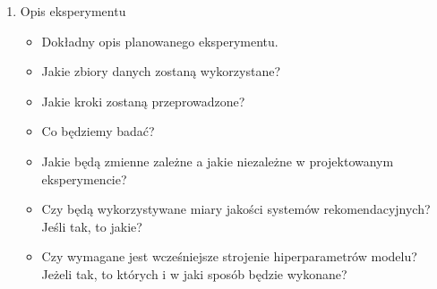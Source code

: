 \documentclass[a4paper,onecolumn]{LTJournalArticle}
\begin{document}
\begin{enumerate}
\begin{enumerate}
\begin{itemize}
			\end{itemize}
			\item Opis eksperymentu
			\begin{itemize}
				\item Dokładny opis planowanego eksperymentu.
				\item Jakie zbiory danych zostaną wykorzystane?
				\item Jakie kroki zostaną przeprowadzone?
				\item Co będziemy badać?
				\item Jakie będą zmienne zależne a jakie niezależne w projektowanym eksperymencie?
				\item Czy będą wykorzystywane miary jakości systemów rekomendacyjnych? Jeśli tak, to jakie?
				\item Czy wymagane jest wcześniejsze strojenie hiperparametrów modelu? Jeżeli tak, to których i w jaki sposób będzie wykonane?
			\end{itemize}
		\end{enumerate}
	\end{enumerate}


	
	\printbibliography %
	
	
\end{document}
